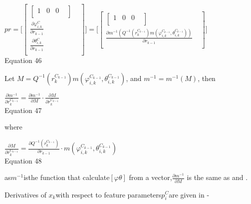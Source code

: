 $pr=\lbrack \begin{bmatrix}
\begin{bmatrix}
1 & 0 & 0 & \\
\end{bmatrix}
 & \\
\frac{\partial \varphi _{i, k}^{C}}{\partial r_{k-1}} & \\
\frac{\partial \theta _{i, k}^{C}}{\partial r_{k-1}} & \\
\end{bmatrix}
\rbrack =\lbrack \begin{bmatrix}
\begin{bmatrix}
1 & 0 & 0 & \\
\end{bmatrix}
 & \\
\frac{\partial m^{-1}(Q^{-1}(r_{k}^{C_{k-1}})m(\varphi _{i, 
k}^{C_{k-1}}, \theta _{i, k}^{C_{k-1}}))}{\partial r_{k-1}} & \\
\end{bmatrix}
\rbrack $\\


Equation 46

Let $M=Q^{-1}(r_{k}^{C_{k-1}})m(\varphi _{i, k}^{C_{k-1}}, \theta _{i, 
k}^{C_{k-1}})$, and $m^{-1}=m^{-1}(M)$, then

$\frac{\partial m^{-1}}{\partial r_{k}^{C_{k-1}}}=\frac{\partial 
m^{-1}}{\partial M}\cdot \frac{\partial M}{\partial r_{k}^{C_{k-1}}}$
\\


Equation 47

where

$\frac{\partial M}{\partial r_{k}^{C_{k-1}}}= \frac{\partial 
Q^{-1}(r_{k}^{C_{k-1}})}{\partial r_{k-1}}\cdot m(\varphi _{i, 
k}^{C_{k-1}}, \theta _{i, k}^{C_{k-1}})$\\


Equation 48

as$m^{-1}$isthe function that calculate$[\varphi \theta ]$ from a 
vector,$\frac{\partial m^{-1}}{\partial M}$ is the same as and .

Derivatives of $x_{k}$with respect to feature parameters$p_{i}^{C}
$are given in - 

